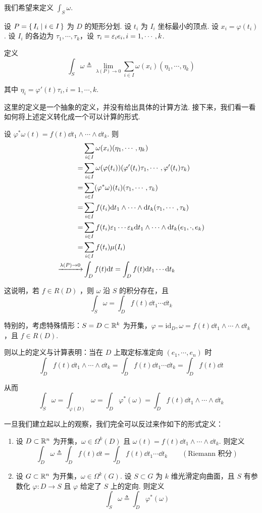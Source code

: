 我们希望来定义 $\displaystyle\int_S\omega$.

设 $P=\set{I_i|i\in I}$ 为 $D$ 的矩形分划. 设 $t_i$ 为 $I_i$ 坐标最小的顶点. 设 $x_i=\varphi(t_i)$. 设 $I_i$ 的各边为 $\tau_1,\cdots,\tau_k$，设 $\tau_i=\varepsilon_ie_i,i=1,\cdots,k$.

定义
$$
\int_S\omega\triangleq\lim_{\lambda(P)\to 0}\sum_{i\in I}\omega(x_i)(\eta_1,\cdots,\eta_k)
$$

其中 $\eta_i=\varphi'(t)\tau_i,i=1,\cdots,k$.

这里的定义是一个抽象的定义，并没有给出具体的计算方法. 接下来，我们看一看如何将上述定义转化成一个可以计算的形式.

设 $\varphi^*\omega(t)=f(t)\dd t_1\wedge\cdots\wedge\dd t_k$. 则
$$
\begin{aligned}
    &\sum_{i\in I}\omega(x_i)(\eta_1,\cdots,\eta_k)\\
    =&\sum_{i\in I}\omega(\varphi(t_i))(\varphi'(t_i)\tau_1,\cdots,\varphi'(t_i)\tau_k)\\
    =&\sum_{i\in I}(\varphi^*\omega)(t_i)(\tau_1,\cdots,\tau_k)\\
    =&\sum_{i\in I}f(t_i)\mathrm{d} t_1\wedge\cdots\wedge\mathrm{d} t_k(\tau_1,\cdots,\tau_k)\\
    =&\sum_{i\in I}f(t_i)\varepsilon_1\cdots\varepsilon_k\mathrm{d} t_1\wedge\cdots\wedge\mathrm{d} t_k(e_1,\cdot,e_k)\\
    =&\sum_{i\in I}f(t_i)\mu(I_i)\\
    \xrightarrow{\lambda(P)\to 0}&\int_Df(t)\mathrm{d} t=\int_Df(t)\mathrm{d} t_1\cdots\mathrm{d} t_k
\end{aligned}
$$

这说明，若 $f\in R(D)$ ，则 $\omega$ 沿 $S$ 的积分存在，且
$$
\int_S\omega=\int_Df(t)\dd t_1\cdots\dd t_k
$$

特别的，考虑特殊情形：$S=D\subset\mathbb{R}^k$ 为开集，$\varphi=\text{id}_D,\omega=f(t)\dd t_1\wedge\cdots\wedge\dd t_k$ ，且 $f\in R(D)$.

则以上的定义与计算表明：当在 $D$ 上取定标准定向 $(e_1,\cdots,e_n)$ 时
$$
\int_Df(t)\dd t_1\wedge\cdots\wedge\dd t_k=\int_Df(t)\dd t_1\cdots\dd t_k=\int_Df(t)\dd t
$$

从而
$$
\int_S\omega=\int_{\varphi(D)}\omega=\int_D\varphi^*(\omega)=\int_Df(t)\dd t_1\wedge\cdots\wedge\dd t_k
$$

一旦我们建立起以上的观察，我们完全可以反过来作如下的形式定义：

\begin{definition}
    \begin{enumerate}
        \item 设 $D\subset\mathbb{R}^n$ 为开集，$\omega\in\Omega^k(D)$ 且 $\omega(t)=f(t)\dd t_1\wedge\cdots\wedge\dd t_k$. 则定义
$$
\int_D\omega\triangleq\int_Df(t)\dd t=\int_Df(t)\dd t_1\cdots\dd t_k\qquad(\text{Riemann 积分})
$$

        \item\label{df:dfint} 设 $G\subset\mathbb{R}^n$ 为开集，$\omega\in\Omega^k(G)$. 设 $S\subset G$ 为 $k$ 维光滑定向曲面，且 $S$ 有参数化 $\varphi:D\to S$ 且 $\varphi$ 给定了 $S$ 上的定向. 则定义
$$
\int_S\omega\triangleq\int_D\varphi^*(\omega)
$$
    \end{enumerate}
\end{definition}

